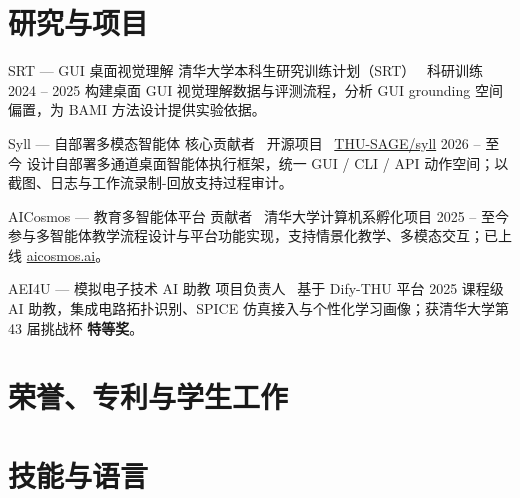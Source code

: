 \documentclass[10pt]{article}
\begin{document}
\section{研究与项目}


\cventry%
  {SRT --- GUI 桌面视觉理解}%
  {清华大学本科生研究训练计划（SRT） \cvsep\ 科研训练}%
  {2024 -- 2025}%
  {构建桌面 GUI 视觉理解数据与评测流程，分析 GUI grounding 空间偏置，为 BAMI 方法设计提供实验依据。}

\cventry%
  {Syll --- 自部署多模态智能体}%
  {核心贡献者 \cvsep\ 开源项目 \cvsep\ \href{https://github.com/THU-SAGE/syll}{THU-SAGE/syll}}%
  {2026 -- 至今}%
  {设计自部署多通道桌面智能体执行框架，统一 GUI / CLI / API 动作空间；以截图、日志与工作流录制-回放支持过程审计。}


\cventry%
  {AICosmos --- 教育多智能体平台}%
  {贡献者 \cvsep\ 清华大学计算机系孵化项目}%
  {2025 -- 至今}%
  {参与多智能体教学流程设计与平台功能实现，支持情景化教学、多模态交互；\mbox{已上线} \href{https://aicosmos.ai}{aicosmos.ai}。}

\cventry%
  {AEI4U --- 模拟电子技术 AI 助教}%
  {项目负责人 \cvsep\ 基于 Dify-THU 平台}%
  {2025}%
  {课程级 AI 助教，集成电路拓扑识别、SPICE 仿真接入与个性化学习画像；获清华大学第 43 届\mbox{挑战杯} \mbox{\textbf{特等奖}}。}

\section{荣誉、专利与学生工作}


\section{技能与语言}

\end{document}
